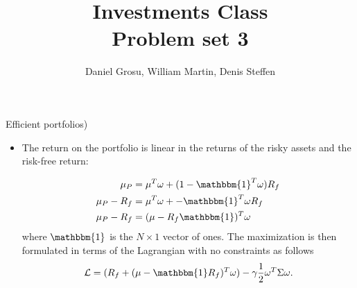 \documentclass[10pt]{article}
\newcommand{\Lcal}{\mathcal{L}}
\newenvironment{exercise}[2][Exercise]{\begin{trivlist}
  \item[\hskip \labelsep {\bfseries #1}\hskip \labelsep {\bfseries #2.}]}{\end{trivlist}}
\begin{document}
	
  \renewcommand{\qedsymbol}{\smiley}
	\title{Investments Class \\ Problem set 3}
	\author{Daniel Grosu, William Martin, Denis Steffen}
	
	\maketitle

  \begin{exercise}{1}(Efficient portfolios)
    \begin{itemize}
      \item
    The return on the portfolio is linear in the returns of the risky assets and
    the risk-free return:

    \begin{align*}
      \mu_P &= \mu^T \omega + (1 - \mathbbm{1}^T \omega) R_f \\
      \mu_P - R_f &= \mu^T \omega +  - \mathbbm{1}^T \omega R_f \\
      \mu_P - R_f &= (\mu - R_f\mathbbm{1})^T \omega
    \end{align*}
    where $\mathbbm{1}$ is the $N \times 1$ vector of ones. The maximization is
    then formulated in terms of the Lagrangian with no constraints as follows
    \begin{align*}
      \Lcal = (R_f + (\mu - \mathbbm{1}R_f)^T \omega) - \gamma \frac 1 2 \omega^T \Sigma \omega.
    \end{align*}
    

\end{itemize}
\end{exercise}
\end{document}
